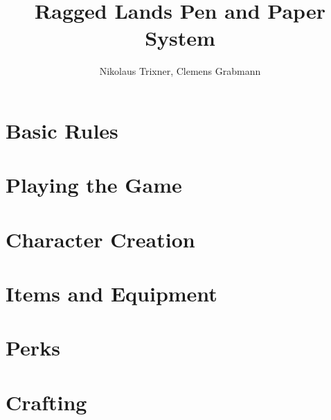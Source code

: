 \documentclass[a4paper]{book}
\begin{document}
	\title{Ragged Lands Pen and Paper System}
	\author{Nikolaus Trixner, Clemens Grabmann}
		
	\maketitle
	
	\tableofcontents

%	
%	


\part{Basic Rules}\label{part:basicRules}
	
\part{Playing the Game}\label{part:playingTheGame}
	
	
	
	

\part{Character Creation}\label{part:characterCreation}
	
	
	
	
%	

\part{Items and Equipment}\label{part:itemsEquipment}
	
	

\part{Perks}\label{part:perks}
	
	
	
	
	
	
	

\part{Crafting}\label{part:crafting}
	

%	

\begin{appendices}
	
	
%	

\end{appendices}
\end{document}
